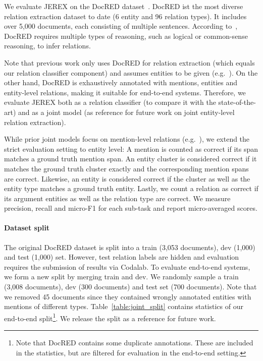 \documentclass[11pt,a4paper]{article}
\newcommand\name{JEREX}
\begin{document}
We evaluate \name{} on the DocRED dataset~\cite{yao:2019:docred}. DocRED ist the most diverse relation extraction dataset to date (6 entity and 96 relation types). It includes over 5,000 documents, each consisting of multiple sentences. According to~\citet{yao:2019:docred}, DocRED requires multiple types of reasoning, such as logical or common-sense reasoning, to infer relations. 

Note that previous work only uses DocRED for relation extraction (which equals our relation classifier component) and assumes entities to be given (e.g.~\citealt{wang:2019:two-step-bert, nan:2020:bert_lsr}). On the other hand, DocRED is exhaustively annotated with mentions, entities and entity-level relations, making it suitable for end-to-end systems. 
Therefore, we evaluate \name{} both as a relation classifier (to compare it with the state-of-the-art) and as a joint model (as reference for future work on joint entity-level relation extraction).  

While prior joint models focus on mention-level relations (e.g.~\citealt{gupta:2016:table_filling, bekoulis:2018:multi_head, chi:2019:hierarch_attention}), we extend the strict evaluation setting to entity level: A mention is counted as correct if its span matches a ground truth mention span. An entity cluster is considered correct if it matches the ground truth cluster exactly and the corresponding mention spans are correct. Likewise, an entity is considered correct if the cluster as well as the entity type matches a ground truth entity. Lastly, we count a relation as correct if its argument entities as well as the relation type are correct. We measure precision, recall and micro-F1 for each sub-task and report micro-averaged scores.

\paragraph{Dataset split} The original DocRED dataset is split into a train (3,053 documents), dev (1,000) and test (1,000) set. However, test relation labels are hidden and evaluation requires the submission of results via Codalab. To evaluate end-to-end systems, we form a new split by merging train and dev. We randomly sample a train (3,008 documents), dev (300 documents) and test set (700 documents). Note that we removed 45 documents since they contained wrongly annotated entities with mentions of different types. Table~\ref{table:joint_split} contains statistics of our end-to-end split\footnote{Note that DocRED contains some duplicate annotations. These are included in the statistics, but are filtered for evaluation in the end-to-end setting.}. We release the split as a reference for future work.
\end{document}
